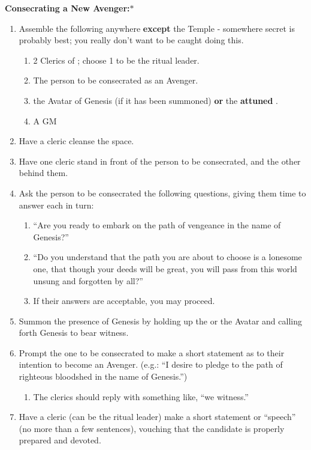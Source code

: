 \documentclass[green]{GL2020}
\begin{document}
\textbf{Consecrating a New Avenger:}$*$\\
\begin{enumerate}
  \item Assemble the following anywhere \textbf{except} the Temple - somewhere secret is probably best; you really don’t want to be caught doing this.
  \begin{enumerate}
    \item 2 Clerics of \cGenesis{}; choose 1 to be the ritual leader.
    \item The person to be consecrated as an Avenger.
    \item the Avatar of Genesis (if it has been summoned) \textbf{or} the \textbf{attuned} \iHorseshoe{}.
    \item A GM
  \end{enumerate}
  \item Have a cleric cleanse the space. 
  \item Have one cleric stand in front of the person to be consecrated, and the other behind them.
  \item Ask the person to be consecrated the following questions, giving them time to answer each in turn: 
  \begin{enumerate}
    \item ``Are you ready to embark on the path of vengeance in the name of Genesis?''
    \item ``Do you understand that the path you are about to choose is a lonesome one, that though your deeds will be great, you will pass from this world unsung and forgotten by all?''
    \item If their answers are acceptable, you may proceed.
  \end{enumerate}
  \item Summon the presence of Genesis by holding up the \iHorseshoe{} or the Avatar and calling forth Genesis to bear witness.
  \item Prompt the one to be consecrated to make a short statement as to their intention to become an Avenger. (e.g.: ``I desire to pledge to the path of righteous bloodshed in the name of Genesis.'')
  \begin{enumerate}
    \item The clerics should reply with something like, ``we witness.''
  \end{enumerate}
  \item Have a cleric (can be the ritual leader) make a short statement or “speech” (no more than a few sentences), vouching that the candidate is properly prepared and devoted.

\end{enumerate}
\end{document}
